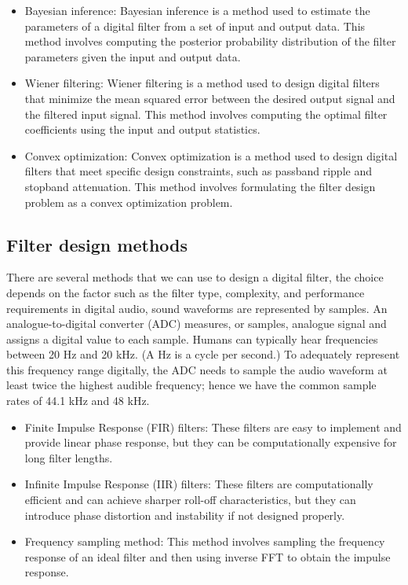 \begin{itemize}
        \item Bayesian inference: Bayesian inference is a method used to estimate the parameters of a digital filter from a set of input and output data. This method involves computing the posterior probability distribution of the filter parameters given the input and output data.
        \item Wiener filtering: Wiener filtering is a method used to design digital filters that minimize the mean squared error between the desired output signal and the filtered input signal. This method involves computing the optimal filter coefficients using the input and output statistics.
        \item Convex optimization: Convex optimization is a method used to design digital filters that meet specific design constraints, such as passband ripple and stopband attenuation. This method involves formulating the filter design problem as a convex optimization problem.
        
    \end{itemize}

    \subsection{Filter design methods}
    There are several methods that we can use to design a digital filter, the choice depends on the factor such as the filter type, complexity, and performance requirements in digital audio, sound waveforms are represented by samples. An analogue-to-digital converter (ADC) measures, or samples, analogue signal and assigns a digital value to each sample. Humans can typically hear frequencies between 20 Hz and 20 kHz. (A Hz is a cycle per second.) To adequately represent this frequency range digitally, the ADC needs to sample the audio waveform at least twice the highest audible frequency; hence we have the common sample rates of 44.1 kHz and 48 kHz.
    \begin{itemize}
        \setlength\itemsep{-0.3em}
        \item Finite Impulse Response (FIR) filters: These filters are easy to implement and provide linear phase response, but they can be computationally expensive for long filter lengths.
        \item Infinite Impulse Response (IIR) filters: These filters are computationally efficient and can achieve sharper roll-off characteristics, but they can introduce phase distortion and instability if not designed properly.
        \item Frequency sampling method: This method involves sampling the frequency response of an ideal filter and then using inverse FFT to obtain the impulse response.  
    \end{itemize}

